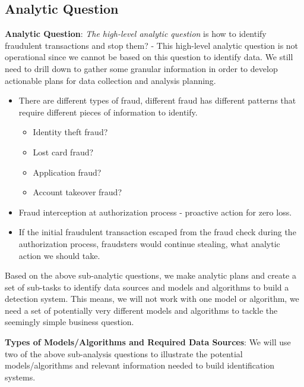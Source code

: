 \documentclass[
]{book}
\providecommand{\tightlist}{%
  \setlength{\itemsep}{0pt}\setlength{\parskip}{0pt}}
\begin{document}
\hypertarget{analytic-question}{%
\subsection{Analytic Question}\label{analytic-question}}

\textbf{Analytic Question}: \emph{The high-level analytic question} is how to identify fraudulent transactions and stop them? - This high-level analytic question is not operational since we cannot be based on this question to identify data. We still need to drill down to gather some granular information in order to develop actionable plans for data collection and analysis planning.

\begin{itemize}
\item
  There are different types of fraud, different fraud has different patterns that require different pieces of information to identify.

  \begin{itemize}
  \tightlist
  \item
    Identity theft fraud?
  \item
    Lost card fraud?
  \item
    Application fraud?
  \item
    Account takeover fraud?
  \end{itemize}
\item
  Fraud interception at authorization process - proactive action for zero loss.
\item
  If the initial fraudulent transaction escaped from the fraud check during the authorization process, fraudsters would continue stealing, what analytic action we should take.
\end{itemize}

Based on the above sub-analytic questions, we make analytic plans and create a set of sub-tasks to identify data sources and models and algorithms to build a detection system. This means, we will not work with one model or algorithm, we need a set of potentially very different models and algorithms to tackle the seemingly simple business question.

\textbf{Types of Models/Algorithms and Required Data Sources}: We will use two of the above sub-analysis questions to illustrate the potential models/algorithms and relevant information needed to build identification systems.
\end{document}

